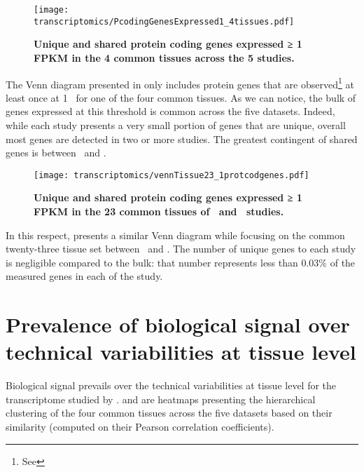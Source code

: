 \begin{figure}[h]
    \texttt{[image: transcriptomics/PcodingGenesExpressed1\_4tissues.pdf]}\centering
    \caption[Unique and shared protein coding genes expressed
    in the 4 common tissues (≥1 FPKM)]{\label{fig:ExpGenePcoding1}\textbf{Unique
    and shared protein coding genes expressed ≥ 1 FPKM in the 4 common tissues
    across the 5 studies.}}
\end{figure}

The Venn diagram presented in  only includes protein
genes that are observed\footnote{See }
at least once at 1 \FPKM\ for one of the four common tissues.
As we can notice, the bulk of genes expressed at this threshold is common
across the five datasets.
Indeed, while each study presents a very small portion of genes
that are unique,
overall most genes are detected in two or more studies.
The greatest contingent of shared genes is between \uhlen\ and \gtex.

\begin{figure}[h]
    \texttt{[image: transcriptomics/vennTissue23\_1protcodgenes.pdf]}\centering
    \caption[Unique and shared protein coding genes expressed
    in the 23 common tissues (≥1 FPKM)]%
    {\label{fig:ExpGenePcoding1_t23}\textbf{Unique
    and shared protein coding genes expressed ≥ 1 FPKM in the 23 common tissues
    of \uhlen\ and \gtex\ studies.}}
\end{figure}

In this respect,  presents a similar Venn diagram
while focusing on the common twenty-three tissue set between \uhlen\ and \gtex.
The number of unique genes to each study is negligible compared to the bulk:
that number represents less than 0.03\% of the measured genes in each of the study.
\begin{comment}
    Gtex:   462/17551 hence 0.02632329\%
    Uhlen:  281/17551 hence 0.01601048\%
\end{comment}


\section{Prevalence of biological signal over technical variabilities at
tissue level}
\label{sec:Trans_ReproExpresTissue}

Biological signal prevails over the technical variabilities at tissue level for
the transcriptome studied by \Rnaseq.
 and  are heatmaps presenting
the hierarchical clustering of the four common tissues across the five datasets
based on their similarity (computed on their Pearson correlation coefficients).


